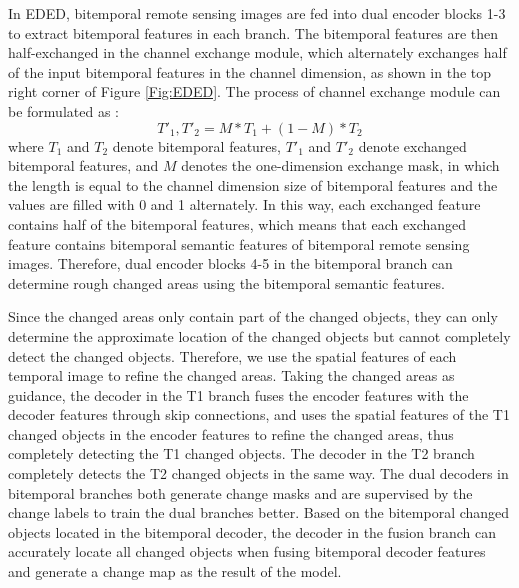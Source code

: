 \documentclass[journal]{IEEEtran}
\begin{document}
In EDED, bitemporal remote sensing images are fed into dual encoder blocks 1-3 to extract bitemporal features in each branch. The bitemporal features are then half-exchanged in the channel exchange module, which alternately exchanges half of the input bitemporal features in the channel dimension, as shown in the top right corner of Figure \ref{Fig:EDED}. The process of channel exchange module can be formulated as :
\begin{equation}
    T'_1, T'_2 = M * T_1 + (1-M) * T_2
\end{equation}
where $T_1$ and $T_2$ denote bitemporal features, $T'_1$ and $T'_2$ denote exchanged bitemporal features, and $M$ denotes the one-dimension exchange mask, in which the length is equal to the channel dimension size of bitemporal features and the values are filled with 0 and 1 alternately. In this way, each exchanged feature contains half of the bitemporal features, which means that each exchanged feature contains bitemporal semantic features of bitemporal remote sensing images. Therefore, dual encoder blocks 4-5 in the bitemporal branch can determine rough changed areas using the bitemporal semantic features.

Since the changed areas only contain part of the changed objects, they can only determine the approximate location of the changed objects but cannot completely detect the changed objects. Therefore, we use the spatial features of each temporal image to refine the changed areas. Taking the changed areas as guidance, the decoder in the T1 branch fuses the encoder features with the decoder features through skip connections, and uses the spatial features of the T1 changed objects in the encoder features to refine the changed areas, thus completely detecting the T1 changed objects. The decoder in the T2 branch completely detects the T2 changed objects in the same way. The dual decoders in bitemporal branches both generate change masks and are supervised by the change labels to train the dual branches better. Based on the bitemporal changed objects located in the bitemporal decoder, the decoder in the fusion branch can accurately locate all changed objects when fusing bitemporal decoder features and generate a change map as the result of the model.
\end{document}
